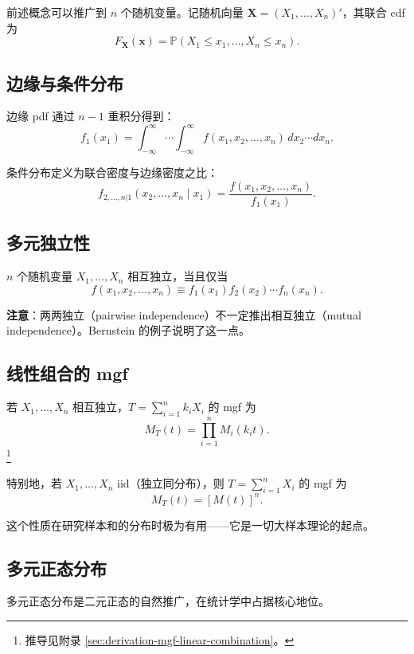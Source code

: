 前述概念可以推广到 $n$ 个随机变量。记随机向量 $\mathbf{X} = (X_1, \ldots, X_n)'$，其联合 cdf 为
\[
F_{\mathbf{X}}(\mathbf{x}) = \mathbb{P}(X_1 \leq x_1, \ldots, X_n \leq x_n).
\]

\subsection{边缘与条件分布}

边缘 pdf 通过 $n-1$ 重积分得到：
\[
f_1(x_1) = \int_{-\infty}^{\infty} \cdots \int_{-\infty}^{\infty} f(x_1, x_2, \ldots, x_n) \, dx_2 \cdots dx_n.
\]

条件分布定义为联合密度与边缘密度之比：
\[
f_{2,\ldots,n|1}(x_2,\ldots,x_n \mid x_1) = \frac{f(x_1, x_2, \ldots, x_n)}{f_1(x_1)}.
\]

\subsection{多元独立性}

$n$ 个随机变量 $X_1, \ldots, X_n$ 相互独立，当且仅当
\begin{equation}\label{eq:multivariate-independence}
f(x_1, x_2, \ldots, x_n) \equiv f_1(x_1) f_2(x_2) \cdots f_n(x_n).
\tag{2.7.1}
\end{equation}

\textbf{注意}：两两独立（pairwise independence）不一定推出相互独立（mutual independence）。Bernstein 的例子说明了这一点。

\subsection{线性组合的 mgf}

若 $X_1, \ldots, X_n$ 相互独立，$T = \sum_{i=1}^n k_i X_i$ 的 mgf 为
\[
M_T(t) = \prod_{i=1}^n M_i(k_i t).
\]\footnote{推导见附录 \cref{sec:derivation-mgf-linear-combination}。}

特别地，若 $X_1, \ldots, X_n$ iid（独立同分布），则 $T = \sum_{i=1}^n X_i$ 的 mgf 为
\begin{equation}\label{eq:mgf-sum-iid}
M_T(t) = [M(t)]^n.
\tag{2.7.2}
\end{equation}

这个性质在研究样本和的分布时极为有用——它是一切大样本理论的起点。

\subsection{多元正态分布}

多元正态分布是二元正态的自然推广，在统计学中占据核心地位。

